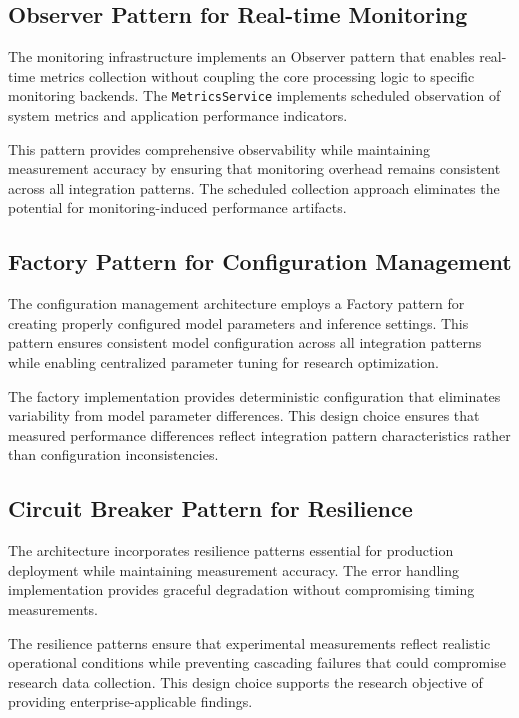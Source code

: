 \subsection{Observer Pattern for Real-time Monitoring}

The monitoring infrastructure implements an Observer pattern that enables real-time metrics collection without coupling the core processing logic to specific monitoring backends. The \texttt{MetricsService} implements scheduled observation of system metrics and application performance indicators.

This pattern provides comprehensive observability while maintaining measurement accuracy by ensuring that monitoring overhead remains consistent across all integration patterns. The scheduled collection approach eliminates the potential for monitoring-induced performance artifacts.

\subsection{Factory Pattern for Configuration Management}

The configuration management architecture employs a Factory pattern for creating properly configured model parameters and inference settings. This pattern ensures consistent model configuration across all integration patterns while enabling centralized parameter tuning for research optimization.

The factory implementation provides deterministic configuration that eliminates variability from model parameter differences. This design choice ensures that measured performance differences reflect integration pattern characteristics rather than configuration inconsistencies.

\subsection{Circuit Breaker Pattern for Resilience}

The architecture incorporates resilience patterns essential for production deployment while maintaining measurement accuracy. The error handling implementation provides graceful degradation without compromising timing measurements.

The resilience patterns ensure that experimental measurements reflect realistic operational conditions while preventing cascading failures that could compromise research data collection. This design choice supports the research objective of providing enterprise-applicable findings.

